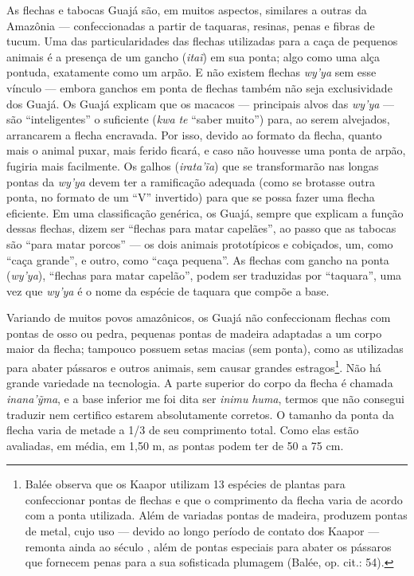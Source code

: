 As flechas e tabocas Guajá são, em muitos aspectos, similares a outras
da Amazônia --- confeccionadas a partir de taquaras, resinas, penas e
fibras de tucum. Uma das particularidades das flechas utilizadas para a
caça de pequenos animais é a presença de um gancho (\emph{itaĩ}) em sua
ponta; algo como uma alça pontuda, exatamente como um arpão. E não
existem flechas \emph{wy'ya} sem esse vínculo --- embora ganchos em ponta
de flechas também não seja exclusividade dos Guajá. Os Guajá explicam
que os macacos --- principais alvos das \emph{wy'ya} --- são ``inteligentes''
o suficiente (\emph{kwa} \emph{te} ``saber muito'') para, ao serem
alvejados, arrancarem a flecha encravada. Por isso, devido ao formato da
flecha, quanto mais o animal puxar, mais ferido ficará, e caso não
houvesse uma ponta de arpão, fugiria mais facilmente. Os galhos
(\emph{irata'ĩa}) que se transformarão nas longas pontas da \emph{wy'ya}
devem ter a ramificação adequada (como se brotasse outra ponta, no
formato de um ``V'' invertido) para que se possa fazer uma flecha
eficiente. Em uma classificação genérica, os Guajá, sempre que explicam
a função dessas flechas, dizem ser ``flechas para matar capelães'', ao
passo que as tabocas são ``para matar porcos'' --- os dois animais
prototípicos e cobiçados, um, como ``caça grande'', e outro, como ``caça
pequena''. As flechas com gancho na ponta (\emph{wy'ya}), ``flechas para
matar capelão'', podem ser traduzidas por ``taquara'', uma vez que
\emph{wy'ya} é o nome da espécie de taquara que compõe a base.

Variando de muitos povos amazônicos, os Guajá não confeccionam flechas
com pontas de osso ou pedra, pequenas pontas de madeira adaptadas a um
corpo maior da flecha; tampouco possuem setas macias (sem ponta), como
as utilizadas para abater pássaros e outros animais, sem causar grandes
estragos\footnote{Balée observa que os Kaapor utilizam 13 espécies de
  plantas para confeccionar pontas de flechas e que o comprimento da
  flecha varia de acordo com a ponta utilizada. Além de variadas pontas
  de madeira, produzem pontas de metal, cujo uso --- devido ao longo
  período de contato dos Kaapor --- remonta ainda ao século , além de
  pontas especiais para abater os pássaros que fornecem penas para a sua
  sofisticada plumagem (Balée, op. cit.: 54).}. Não há grande variedade
na tecnologia. A parte superior do corpo da flecha é chamada
\emph{inana'ỹma}, e a base inferior me foi dita ser \emph{inimu}
\emph{huma}, termos que não consegui traduzir nem certifico estarem
absolutamente corretos. O tamanho da ponta da flecha varia de metade a
1/3 de seu comprimento total. Como elas estão avaliadas, em média, em
1,50 m, as pontas podem ter de 50 a 75 cm.

